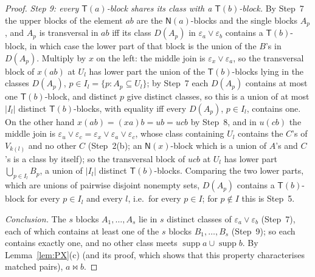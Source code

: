 \documentclass[11pt]{amsart}
\theoremstyle{definition}
\newcommand{\supp}{\operatorname{supp}}
\newcommand{\T}{\mathsf{T}}
\newcommand{\N}{\mathsf{N}}
\begin{document}
\begin{proof}
\emph{Step 9: every $\T(a)$-block shares its class with a $\T(b)$-block.} By Step~7 the upper blocks of the element $ab$ are the $\N(a)$-blocks and the single blocks $A_p$, and $A_p$ is transversal in $ab$ iff its class $D(A_p)$ in $\varepsilon_a\vee\varepsilon_b$ contains a $\T(b)$-block, in which case the lower part of that block is the union of the $B$'s in $D(A_p)$. Multiply by $x$ on the left: the middle join is $\varepsilon_x\vee\varepsilon_a$, so the transversal block of $x(ab)$ at $U_l$ has lower part the union of the $\T(b)$-blocks lying in the classes $D(A_p)$, $p\in I_l=\{p:A_p\subseteq U_l\}$; by Step~7 each $D(A_p)$ contains at most one $\T(b)$-block, and distinct $p$ give distinct classes, so this is a union of at most $|I_l|$ distinct $\T(b)$-blocks, with equality iff every $D(A_p)$, $p\in I_l$, contains one. On the other hand $x(ab)=(xa)b=ub=ucb$ by Step~8, and in $u(cb)$ the middle join is $\varepsilon_u\vee\varepsilon_c=\varepsilon_x\vee\varepsilon_a\vee\varepsilon_c$, whose class containing $U_l$ contains the $C$'s of $V_{k(l)}$ and no other $C$ (Step~2(b); an $\N(x)$-block which is a union of $A$'s and $C$'s is a class by itself); so the transversal block of $ucb$ at $U_l$ has lower part $\bigcup_{p\in I_l}B_p$, a union of $|I_l|$ distinct $\T(b)$-blocks. Comparing the two lower parts, which are unions of pairwise disjoint nonempty sets, $D(A_p)$ contains a $\T(b)$-block for every $p\in I_l$ and every $l$, i.e.\ for every $p\in I$; for $p\notin I$ this is Step~5.

\emph{Conclusion.} The $s$ blocks $A_1,\dots,A_s$ lie in $s$ distinct classes of $\varepsilon_a\vee\varepsilon_b$ (Step~7), each of which contains at least one of the $s$ blocks $B_1,\dots,B_s$ (Step~9); so each contains exactly one, and no other class meets $\supp a\cup\supp b$. By Lemma~\ref{lem:PX}(c) (and its proof, which shows that this property characterises matched pairs), $a\bowtie b$.
\end{proof}
\end{document}
